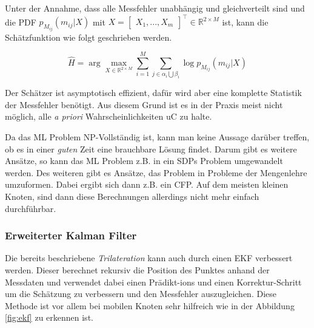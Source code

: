 Unter der Annahme, dass alle Messfehler unabhängig und gleichverteilt
sind und die \ac{PDF} $p_{M_{ij}}(m_{ij} \vert X)$ mit $X
= \begin{bmatrix}X_{1}, ..., X_{m}\end{bmatrix}^{\top} \in
\mathbb{R}^{2 \times M}$ ist, kann die Schätzfunktion wie folgt
geschrieben werden.

\begin{framed}
  \begin{equation}
    \label{eq:maxlike}
    \hat H = \arg \max_{X \in \mathbb{R}^{2 \times M}} \sum_{i=1}^{M}
    \sum_{j \in \alpha_{i} \bigcup \beta_{i}} \log p_{M_{ij}}(m_{ij}
    \vert X)
  \end{equation}
\end{framed}

Der Schätzer ist asymptotisch effizient, dafür wird aber eine
komplette Statistik der Messfehler benötigt. Aus diesem Grund ist es
in der Praxis meist nicht möglich, alle \textit{a priori}
Wahrscheinlichkeiten \ac{uC} zu halte.

Da das \ac{ML} Problem NP-Vollständig ist, kann man keine Aussage
darüber treffen, ob es in einer \textit{guten} Zeit eine brauchbare
Lösung findet. Darum gibt es weitere Ansätze, so kann das \ac{ML}
Problem z.B. in ein \ac{SDP}s Problem umgewandelt werden. Des weiteren
gibt es Ansätze, das Problem in Probleme der Mengenlehre umzuformen.
Dabei ergibt sich dann z.B. ein \ac{CFP}. Auf dem meisten kleinen
Knoten, sind dann diese Berechnungen allerdings nicht mehr einfach
durchführbar. \cite{gholami2011}


\subsubsection{Erweiterter Kalman Filter}

Die bereits beschriebene \textit{Trilateration} kann auch durch einen
\ac{EKF} verbessert werden. Dieser berechnet rekursiv die Position des
Punktes anhand der Messdaten und verwendet dabei einen Prädikt-ions
und einen Korrektur-Schritt um die Schätzung zu verbessern und den
Messfehler auszugleichen. Diese Methode ist vor allem bei mobilen
Knoten sehr hilfreich wie in der Abbildung \ref{fig:ekf} zu erkennen
ist.

